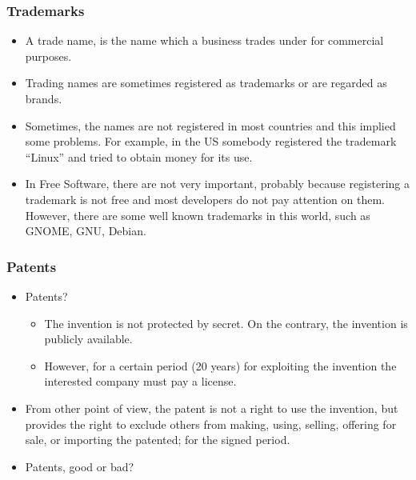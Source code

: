 \begin{frame}
\frametitle{Trademarks}

\begin{itemize}
\item A trade name, is the name which a business trades under for commercial
purposes.

\item Trading names are sometimes registered as trademarks or are regarded
as brands.

\item Sometimes, the names are not registered in most countries and this
implied some problems. For example, in the US somebody registered the
trademark ``Linux'' and tried to obtain money for its use.

\item In Free Software, there are not very important, probably because
registering a trademark is not free and most developers do not pay
attention on them. However, there are some well known trademarks in
this world, such as GNOME, GNU, Debian.

\end{itemize}

\end{frame}




\begin{frame}
\frametitle{Patents}

\begin{itemize}
\item Patents?
\begin{itemize}
\item The invention is not protected by secret. On the contrary, the
  invention is publicly available.
\item However, for a certain period (20 years) for
  exploiting the invention the interested company must pay a license.
\end{itemize}

\item From other point of view, the patent is not a right to use the
invention, but provides the right to exclude others from making,
using, selling, offering for sale, or importing the patented; for the
signed period.

\item Patents, good or bad?
\end{itemize}

\end{frame}



